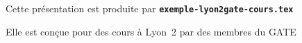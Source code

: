 
  \item Cette présentation est produite par \texttt{\textbf{exemple-lyon2gate-cours.tex}}
  \item Elle est conçue pour des cours à Lyon~2 par des membres du GATE
